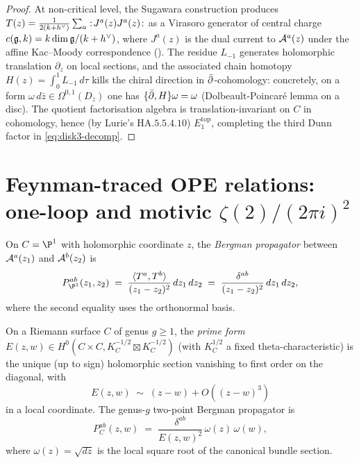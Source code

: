 \begin{proof}
At non-critical level, the Sugawara construction produces
$T(z) = \tfrac{1}{2(k+h^\vee)}\sum_a:\!J^a(z)J^a(z)\!:$ as a
Virasoro generator of central charge
$c(\mathfrak{g},k) = k\dim\mathfrak{g}/(k+h^\vee)$, where $J^a(z)$ is the dual current
to $\mathcal{A}^a(z)$ under the affine Kac--Moody correspondence
(\cite[Prop.\,5.1]{FrenkelBenZvi2004}). The residue $L_{-1}$ generates
holomorphic translation $\partial_z$ on local sections, and the
associated chain homotopy
$H(z) = \int_0^1 L_{-1}\,d\tau$
kills the chiral direction in $\bar\partial$-cohomology: concretely, on a
form $\omega\,d\bar z\in\Omega^{0,1}(D_z)$ one has
$\{\bar\partial, H\}\omega = \omega$ (Dolbeault-Poincar\'e lemma on a disc).
The quotient factorisation algebra is translation-invariant on $C$ in
cohomology, hence (by Lurie's $\mathrm{HA}.5.5.4.10$) $E_1^{\mathrm{top}}$,
completing the third Dunn factor in \eqref{eq:disk3-decomp}.
\end{proof}

\section{Feynman-traced OPE relations: one-loop and motivic
$\zeta(2)/(2\pi i)^2$}
\label{sec:ch-ce-ope-one-loop}

\begin{definition}
\label{def:bergman-genus-zero}
%
On $C = \P^1$ with holomorphic coordinate $z$, the \emph{Bergman
propagator} between $\mathcal{A}^a(z_1)$ and $\mathcal{A}^b(z_2)$ is
\begin{equation}
\label{eq:bergman-p1}
P^{ab}_{\P^1}(z_1,z_2)
\;=\;
\frac{\langle T^a,T^b\rangle}{(z_1-z_2)^2}\,dz_1\,dz_2
\;=\;
\frac{\delta^{ab}}{(z_1-z_2)^2}\,dz_1\,dz_2,
\end{equation}
where the second equality uses the orthonormal basis.
\end{definition}

\begin{definition}
\label{def:prime-form}
%
On a Riemann surface $C$ of genus $g\ge 1$, the \emph{prime form}
$E(z,w)\in H^0(C\times C,K_C^{-1/2}\boxtimes K_C^{-1/2})$ (with
$K_C^{1/2}$ a fixed theta-characteristic) is the unique
(up to sign) holomorphic section vanishing to first order on the
diagonal, with
\begin{equation}
E(z,w) \;\sim\; (z-w) + O((z-w)^3)
\end{equation}
in a local coordinate. The genus-$g$ two-point Bergman propagator is
\begin{equation}
\label{eq:bergman-genus-g}
P^{ab}_{C}(z,w)
\;=\;
\frac{\delta^{ab}}{E(z,w)^2}\,
\omega(z)\,\omega(w),
\end{equation}
where $\omega(z) = \sqrt{dz}$ is the local square root of the
canonical bundle section.
\end{definition}

